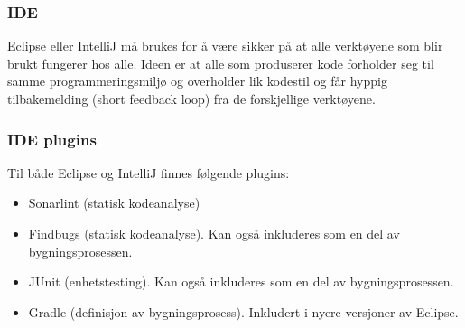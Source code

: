 \documentclass[12pt]{report}
\begin{document}
\subsubsection*{IDE}

Eclipse eller IntelliJ m{\aa} brukes for {\aa} v{\ae}re sikker p{\aa} at alle verkt{\o}yene som blir brukt fungerer hos
alle. Ideen er at alle som produserer kode forholder seg til samme programmeringsmilj{\o} og overholder lik kodestil og
f{\aa}r hyppig tilbakemelding (short feedback loop) fra de forskjellige verkt{\o}yene.

\subsubsection*{IDE plugins}

Til b{\aa}de Eclipse og IntelliJ finnes f{\o}lgende plugins:

\begin{itemize}
\item Sonarlint (statisk kodeanalyse)
\item Findbugs (statisk kodeanalyse). Kan ogs{\aa} inkluderes som en del av bygningsprosessen.
\item JUnit (enhetstesting). Kan ogs{\aa} inkluderes som en del av bygningsprosessen.
\item Gradle (definisjon av bygningsprosess). Inkludert i nyere versjoner av Eclipse.
\end{itemize}
\end{document}
